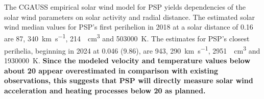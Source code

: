 {The CGAUSS empirical solar wind model for PSP yields dependencies of the solar wind parameters on solar activity and radial distance. The estimated solar wind median values for PSP’s first perihelion in 2018 at a solar distance of \SI{0.16}{\au} are \SI{87}{\nT}, \SI{340}{\km\per\s}, \SI{214}{\per\cm\cubed} and \SI{503000}{\K}. The estimates for PSP’s closest perihelia, beginning in 2024 at \SI{0.046}{\au} (\SI{9.86}{\Rs}), are \SI{943}{\nT}, \SI{290}{\km\per\s}, \SI{2951}{\per\cm\cubed} and \SI{1930000}{\K}. \textbf{Since the modeled velocity and temperature values below about \SI{20}{\Rs} appear overestimated in comparison with existing observations, this suggests that PSP will directly measure solar wind acceleration and heating processes below \SI{20}{\Rs} as planned. } }	%
{}	%


\maketitle





